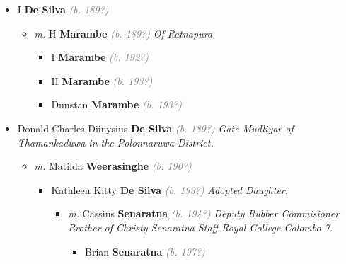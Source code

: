 \documentclass[10pt, openany]{book}
\begin{document}
\begin{itemize}
{\begin{itemize}
{\begin{itemize}
{\begin{itemize}
{\begin{itemize}
{\begin{itemize}
{\begin{itemize}
{\begin{itemize}
{ }
\end{itemize}}
\end{itemize}
 }
\end{itemize}}
\end{itemize}
  }
\end{itemize}}
\end{itemize}
   }
\item{I \textbf{De Silva} \textcolor{gray}{\textit{(b. 189?)}}
\begin{itemize}
\item{\textit{m.} H \textbf{Marambe} \textcolor{gray}{\textit{(b. 189?)}} \textcolor{slmaroon}{\textit{Of Ratnapura.}}   \label{couple:00000147:00000529} \begin{itemize}
\item{I \textbf{Marambe} \textcolor{gray}{\textit{(b. 192?)}}
 }
\item{II \textbf{Marambe} \textcolor{gray}{\textit{(b. 193?)}}
 }
\item{Dunstan \textbf{Marambe} \textcolor{gray}{\textit{(b. 193?)}}
 }
\end{itemize}}
\end{itemize}
  }
\item{Donald Charles Diinysius \textbf{De Silva} \textcolor{gray}{\textit{(b. 189?)}} \textcolor{slmaroon}{\textit{Gate Mudliyar of Thamankaduwa in the Polonnaruwa District.}}
\begin{itemize}
\item{\textit{m.} Matilda \textbf{Weerasinghe} \textcolor{gray}{\textit{(b. 190?)}}   \label{couple:00000144:00000937} \begin{itemize}
\item{Kathleen Kitty \textbf{De Silva} \textcolor{gray}{\textit{(b. 193?)}} \textcolor{slmaroon}{\textit{Adopted Daughter.}}
\begin{itemize}
\item{\textit{m.} Cassius \textbf{Senaratna} \textcolor{gray}{\textit{(b. 194?)}} \textcolor{slmaroon}{\textit{Deputy Rubber Commisioner Brother of Christy Senaratna Staff Royal College Colombo 7.}}   \label{couple:00000151:00000714} \begin{itemize}
\item{Brian \textbf{Senaratna} \textcolor{gray}{\textit{(b. 197?)}}
 }

\end{itemize}}
\end{itemize}}
\end{itemize}}
\end{itemize}}
\end{itemize}}
\end{itemize}
\end{document}
